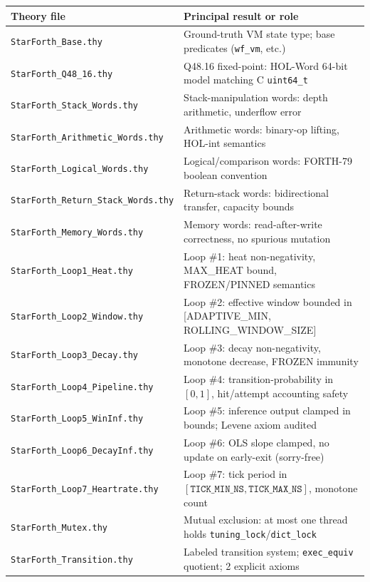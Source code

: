 \begin{table}[ht]
\centering
\small
\begin{tabular}{ll}
\toprule
Theory file & Principal result or role \\
\midrule
\texttt{StarForth\_Base.thy}
  & Ground-truth VM state type; base predicates (\texttt{wf\_vm}, etc.) \\
\texttt{StarForth\_Q48\_16.thy}
  & Q48.16 fixed-point: HOL-Word 64-bit model matching C \texttt{uint64\_t} \\
\texttt{StarForth\_Stack\_Words.thy}
  & Stack-manipulation words: depth arithmetic, underflow error \\
\texttt{StarForth\_Arithmetic\_Words.thy}
  & Arithmetic words: binary-op lifting, HOL-int semantics \\
\texttt{StarForth\_Logical\_Words.thy}
  & Logical/comparison words: FORTH-79 boolean convention \\
\texttt{StarForth\_Return\_Stack\_Words.thy}
  & Return-stack words: bidirectional transfer, capacity bounds \\
\texttt{StarForth\_Memory\_Words.thy}
  & Memory words: read-after-write correctness, no spurious mutation \\
\texttt{StarForth\_Loop1\_Heat.thy}
  & Loop \#1: heat non-negativity, MAX\_HEAT bound, FROZEN/PINNED semantics \\
\texttt{StarForth\_Loop2\_Window.thy}
  & Loop \#2: effective window bounded in [ADAPTIVE\_MIN, ROLLING\_WINDOW\_SIZE] \\
\texttt{StarForth\_Loop3\_Decay.thy}
  & Loop \#3: decay non-negativity, monotone decrease, FROZEN immunity \\
\texttt{StarForth\_Loop4\_Pipeline.thy}
  & Loop \#4: transition-probability in $[0,1]$, hit/attempt accounting safety \\
\texttt{StarForth\_Loop5\_WinInf.thy}
  & Loop \#5: inference output clamped in bounds; Levene axiom audited \\
\texttt{StarForth\_Loop6\_DecayInf.thy}
  & Loop \#6: OLS slope clamped, no update on early-exit (sorry-free) \\
\texttt{StarForth\_Loop7\_Heartrate.thy}
  & Loop \#7: tick period in $[\texttt{TICK\_MIN\_NS}, \texttt{TICK\_MAX\_NS}]$, monotone count \\
\texttt{StarForth\_Mutex.thy}
  & Mutual exclusion: at most one thread holds \texttt{tuning\_lock}/\texttt{dict\_lock} \\
\texttt{StarForth\_Transition.thy}
  & Labeled transition system; \texttt{exec\_equiv} quotient; 2 explicit axioms \\

\end{tabular}
\end{table}
